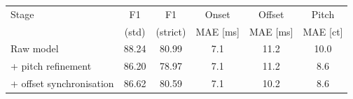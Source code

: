 \begin{tabular}{lccccc}
\hline
Stage & F1 & F1 & Onset & Offset & Pitch \\
      & (std) & (strict) & MAE [ms] & MAE [ms] & MAE [ct] \\
\hline
Raw model & 88.24 & 80.99 & 7.1 & 11.2 & 10.0 \\
+ pitch refinement & 86.20 & 78.97 & 7.1 & 11.2 & 8.6 \\
+ offset synchronisation & 86.62 & 80.59 & 7.1 & 10.2 & 8.6 \\
\hline
\end{tabular}
